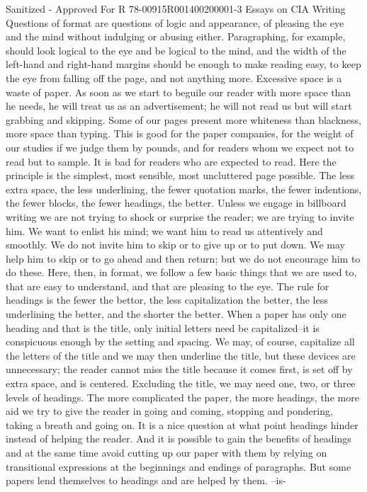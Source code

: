 \documentclass[
    oneside,
    11pt,
    draft
]{memoir}
\begin{document}
Sanitized - Approved For R 78-00915R001400200001-3 Essays on CIA Writing Questions of format are questions of logic and appearance, of pleasing the eye and the mind without indulging or abusing either. Paragraphing, for example, should look logical to the eye and be logical to the mind, and the width of the left-hand and right-hand margins should be enough to make reading easy, to keep the eye from falling off the page, and not anything more. Excessive space is a waste of paper. As soon as we start to beguile our reader with more space than he needs, he will treat us as an advertisement; he will not read us but will start grabbing and skipping. Some of our pages present more whiteness than blackness, more space than typing. This is good for the paper companies, for the weight of our studies if we judge them by pounds, and for readers whom we expect not to read but to sample. It is bad for readers who are expected to read. Here the principle is the simplest, most sensible, most uncluttered page possible. The less extra space, the less underlining, the fewer quotation marks, the fewer indentions, the fewer blocks, the fewer headings, the better. Unless we engage in billboard writing we are not trying to shock or surprise the reader; we are trying to invite him. We want to enlist his mind; we want him to read us attentively and smoothly. We do not invite him to skip or to give up or to put down. We may help him to skip or to go ahead and then return; but we do not encourage him to do these. Here, then, in format, we follow a few basic things that we are used to, that are easy to understand, and that are pleasing to the eye. The rule for headings is the fewer the bettor, the less capitalization the better, the less underlining the better, and the shorter the better. When a paper has only one heading and that is the title, only initial letters need be capitalized--it is conspicuous enough by the setting and spacing. We may, of course, capitalize all the letters of the title and we may then underline the title, but these devices are unnecessary; the reader cannot miss the title because it comes first, is set off by extra space, and is centered. Excluding the title, we may need one, two, or three levels of headings. The more complicated the paper, the more headings, the more aid we try to give the reader in going and coming, stopping and pondering, taking a breath and going on. It is a nice question at what point headings hinder instead of helping the reader. And it is possible to gain the benefits of headings and at the same time avoid cutting up our paper with them by relying on transitional expressions at the beginnings and endings of paragraphs. But some papers lend themselves to headings and are helped by them. --is-
\end{document}
